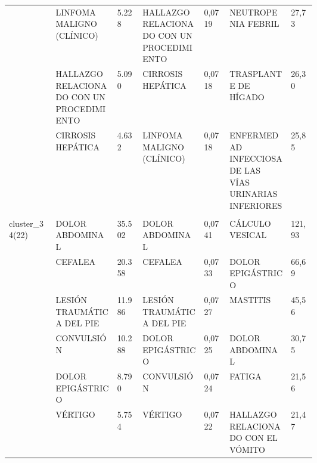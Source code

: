 \begin{landscape}
\begin{longtable}[c]{@{}lp{0.2\linewidth}lp{0.2\linewidth}lp{0.2\linewidth}l@{}}
                                  & LINFOMA MALIGNO (CLÍNICO)                                     & 5.228  & HALLAZGO RELACIONADO CON UN PROCEDIMIENTO              & 0,0719 & NEUTROPENIA FEBRIL                                            & 27,73    \\
                                  & HALLAZGO RELACIONADO CON UN PROCEDIMIENTO                     & 5.090  & CIRROSIS HEPÁTICA                                      & 0,0718 & TRASPLANTE DE HÍGADO                                          & 26,30    \\
                                  & CIRROSIS HEPÁTICA                                             & 4.632  & LINFOMA MALIGNO (CLÍNICO)                              & 0,0718 & ENFERMEDAD INFECCIOSA DE LAS VÍAS URINARIAS INFERIORES        & 25,85    \\ \\
\multirow{10}{*}{cluster\_34(22)} & DOLOR ABDOMINAL                                               & 35.502 & DOLOR ABDOMINAL                                        & 0,0741 & CÁLCULO VESICAL                                               & 121,93   \\
                                  & CEFALEA                                                       & 20.358 & CEFALEA                                                & 0,0733 & DOLOR EPIGÁSTRICO                                             & 66,69    \\
                                  & LESIÓN TRAUMÁTICA DEL PIE                                     & 11.986 & LESIÓN TRAUMÁTICA DEL PIE                              & 0,0727 & MASTITIS                                                      & 45,56    \\
                                  & CONVULSIÓN                                                    & 10.288 & DOLOR EPIGÁSTRICO                                      & 0,0725 & DOLOR ABDOMINAL                                               & 30,75    \\
                                  & DOLOR EPIGÁSTRICO                                             & 8.790  & CONVULSIÓN                                             & 0,0724 & FATIGA                                                        & 21,56    \\
                                  & VÉRTIGO                                                       & 5.754  & VÉRTIGO                                                & 0,0722 & HALLAZGO RELACIONADO CON EL VÓMITO                            & 21,47    \\

\end{longtable}
\end{landscape}
